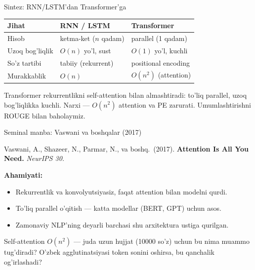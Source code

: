 \documentclass[aspectratio=169,11pt]{beamer}
\begin{document}
\begin{frame}{Sintez: RNN/LSTM'dan Transformer'ga}
  \begin{center}\small
  \begin{tabular}{p{3.4cm}p{3.9cm}p{4.0cm}}
    \toprule
    \textbf{Jihat} & \textbf{RNN / LSTM} & \textbf{Transformer} \\
    \midrule
    Hisob & ketma-ket ($n$ qadam) & parallel (1 qadam) \\
    Uzoq bog'liqlik & $O(n)$ yo'l, sust & $O(1)$ yo'l, kuchli \\
    So'z tartibi & tabiiy (rekurrent) & positional encoding \\
    Murakkablik & $O(n)$ & $O(n^2)$ (attention) \\
    \bottomrule
  \end{tabular}
  \end{center}
  \vspace{4pt}
  \begin{tcolorbox}[okbox,title=Asosiy g'oya,top=2pt,bottom=2pt]
    \footnotesize
    Transformer rekurrentlikni self-attention bilan almashtiradi: to'liq
    parallel, uzoq bog'liqlikka kuchli. Narxi --- $O(n^2)$ attention va PE
    zarurati. Umumlashtirishni ROUGE bilan baholaymiz.
  \end{tcolorbox}
\end{frame}

\begin{frame}{Seminal manba: Vaswani va boshqalar (2017)}
  \begin{tcolorbox}[defbox,title=Manba]
    \small
    Vaswani, A., Shazeer, N., Parmar, N., va boshq.\ (2017).
    \textbf{Attention Is All You Need.} \textit{NeurIPS 30.}
  \end{tcolorbox}
  \vspace{5pt}
  \textbf{Ahamiyati:}
  \begin{itemize}\small\setlength\itemsep{3pt}
    \item Rekurrentlik va konvolyutsiyasiz, faqat attention bilan modelni qurdi.
    \item To'liq parallel o'qitish --- katta modellar (BERT, GPT) uchun asos.
    \item Zamonaviy NLP'ning deyarli barchasi shu arxitektura ustiga qurilgan.
  \end{itemize}
  \vspace{5pt}
  \begin{tcolorbox}[warnbox,title=Muhokama savoli (P12 gacha o'ylang)]
    \small
    Self-attention $O(n^2)$ --- juda uzun hujjat (10000 so'z) uchun bu nima
    muammo tug'diradi? O'zbek agglutinatsiyasi token sonini oshirsa, bu
    qanchalik og'irlashadi?
  \end{tcolorbox}
\end{frame}
\end{document}
